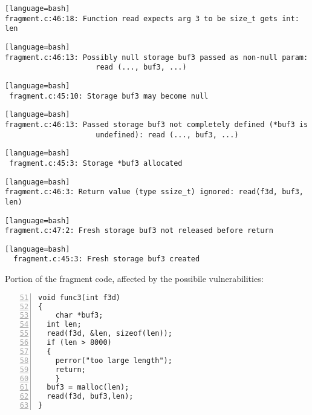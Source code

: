 \documentclass[a4paper,12pt]{article}
\begin{document}
\begin{lstlisting}[style=DOS][language=bash]
fragment.c:46:18: Function read expects arg 3 to be size_t gets int: len
\end{lstlisting}


\begin{lstlisting}[style=DOS][language=bash]
fragment.c:46:13: Possibly null storage buf3 passed as non-null param:
                     read (..., buf3, ...)
\end{lstlisting}

\begin{lstlisting}[style=DOS][language=bash]
 fragment.c:45:10: Storage buf3 may become null
\end{lstlisting}

\begin{lstlisting}[style=DOS][language=bash]
fragment.c:46:13: Passed storage buf3 not completely defined (*buf3 is
                     undefined): read (..., buf3, ...)
\end{lstlisting}

\begin{lstlisting}[style=DOS][language=bash]
 fragment.c:45:3: Storage *buf3 allocated
\end{lstlisting}

\begin{lstlisting}[style=DOS][language=bash]
fragment.c:46:3: Return value (type ssize_t) ignored: read(f3d, buf3, len)
\end{lstlisting}

\begin{lstlisting}[style=DOS][language=bash]
fragment.c:47:2: Fresh storage buf3 not released before return
\end{lstlisting}
\begin{lstlisting}[style=DOS][language=bash]
  fragment.c:45:3: Fresh storage buf3 created
\end{lstlisting}


Portion of the fragment code, affected by the possibile vulnerabilities:
\begin{lstlisting}[style=c,numbers=left,firstnumber=51,linebackgroundcolor={
\ifnum\value{lstnumber}=54\color{red}\fi
\ifnum\value{lstnumber}=55\color{red}\fi
\ifnum\value{lstnumber}=58\color{red}\fi
}]
void func3(int f3d)
{
	char *buf3;
  int len;
  read(f3d, &len, sizeof(len));
  if (len > 8000) 
  { 
  	perror("too large length");
  	return; 
	}
  buf3 = malloc(len);
  read(f3d, buf3,len);        
}
\end{lstlisting}
\end{document}
